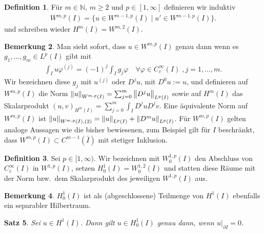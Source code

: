 \documentclass[twoside]{article}
\newcounter{lecnum}
\newtheorem{theorem}{Satz}[lecnum]
\theoremstyle{definition}
\newtheorem{remark}[theorem]{Bemerkung}
\newtheorem{definition}[theorem]{Definition}
\begin{document}
\begin{definition}
Für $m \in \mathbb{N}$, $m \geq 2$ und $p \in [1,\infty]$ definieren wir induktiv
\begin{align*}
W^{m,p}(I) = \{u \in W^{m-1,p}(I)\; | \; u' \in W^{m-1,p}(I)\}.
\end{align*}
und schreiben wieder $H^m(I) = W^{m,2}(I)$.
\end{definition}
\begin{remark}
Man sieht sofort, dass $u \in W^{m,p}(I)$ genau dann wenn es $g_1, \dots , g_m \in L^p(I)$ gibt mit
\begin{align*}
\int_I u \varphi^{(j)} = (-1)^j \int_I g_j \varphi \quad \forall \varphi \in C_c^\infty(I) \; , j = 1 , \dots , m .
\end{align*}
Wir bezeichnen diese $g_j$ mit $u^{(j)}$ oder $D^j u$, mit $D^0 u := u$, und definieren auf $W^{m,p}(I)$ die Norm $\norm{u}_{W^{m,p}(I)}=\sum_{j=0}^m \norm{D^j u}_{L^p(I)}$ sowie auf $H^m(I)$ das Skalarprodukt $(u,v)_{H^m(I)} = \sum_{j=0}^m \int_I D^j u D^j v$. Eine äquivalente Norm auf $W^{m,p}(I)$ ist $\norm{u}_{W^{m,p}(I),(2)}=\norm{u}_{L^p(I)} + \norm{D^m u}_{L^p(I)}$. Für $W^{m,p}(I)$ gelten analoge Aussagen wie die bisher bewiesenen, zum Beispiel gilt für $I$ beschränkt, dass $W^{m,p}(I) \subset C^{m-1}(\bar{I})$ mit stetiger Inklusion.
\end{remark}
\begin{definition}
Sei $p \in [1,\infty)$. Wir bezeichnen mit $W^{1,p}_0(I)$ den Abschluss von $C_c^\infty(I)$ in $W^{1,p}(I)$, setzen $H_0^1(I) = W^{1,2}_0(I)$ und statten diese Räume mit der Norm bzw.\ dem Skalarprodukt des jeweiligen $W^{1,p}(I)$ aus.
\end{definition}
\begin{remark}
$H_0^1(I)$ ist als (abgeschlossene) Teilmenge von $H^1(I)$ ebenfalls ein separabler Hilbertraum.
\end{remark}
\begin{theorem}  \label{thm:w1p0}
Sei $u \in H^1(I)$. Dann gilt $u \in H^1_0(I)$ genau dann, wenn $u|_{\partial I} = 0$.
\end{theorem}
\end{document}
